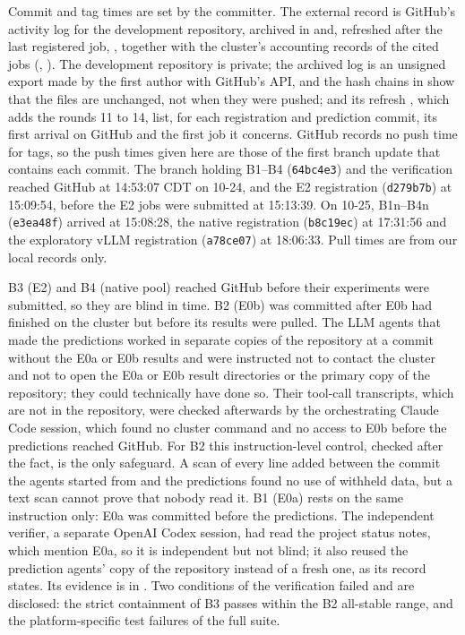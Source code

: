 \noindent Commit and tag times are set by the committer. The external record is GitHub's activity log for the development repository, archived in  and, refreshed after the last registered job, , together with the cluster's accounting records of the cited jobs (, ). The development repository is private; the archived log is an unsigned export made by the first author with GitHub's API, and the hash chains in  show that the files are unchanged, not when they were pushed;  and its refresh , which adds the rounds 11 to 14, list, for each registration and prediction commit, its first arrival on GitHub and the first job it concerns. GitHub records no push time for tags, so the push times given here are those of the first branch update that contains each commit. The branch holding B1--B4 (\texttt{64bc4e3}) and the verification reached GitHub at 14:53:07 CDT on 10-24, and the E2 registration (\texttt{d279b7b}) at 15:09:54, before the E2 jobs were submitted at 15:13:39. On 10-25, B1n--B4n (\texttt{e3ea48f}) arrived at 15:08:28, the native registration (\texttt{b8c19ec}) at 17:31:56 and the exploratory vLLM registration (\texttt{a78ce07}) at 18:06:33. Pull times are from our local records only.

B3 (E2) and B4 (native pool) reached GitHub before their experiments were submitted, so they are blind in time. B2 (E0b) was committed after E0b had finished on the cluster but before its results were pulled. The LLM agents that made the predictions worked in separate copies of the repository at a commit without the E0a or E0b results and were instructed not to contact the cluster and not to open the E0a or E0b result directories or the primary copy of the repository; they could technically have done so. Their tool-call transcripts, which are not in the repository, were checked afterwards by the orchestrating Claude Code session, which found no cluster command and no access to E0b before the predictions reached GitHub. For B2 this instruction-level control, checked after the fact, is the only safeguard. A scan of every line added between the commit the agents started from and the predictions found no use of withheld data, but a text scan cannot prove that nobody read it. B1 (E0a) rests on the same instruction only: E0a was committed before the predictions. The independent verifier, a separate OpenAI Codex session, had read the project status notes, which mention E0a, so it is independent but not blind; it also reused the prediction agents' copy of the repository instead of a fresh one, as its record states. Its evidence is in . Two conditions of the verification failed and are disclosed: the strict containment of B3 passes within the B2 all-stable range, and the platform-specific test failures of the full suite.

